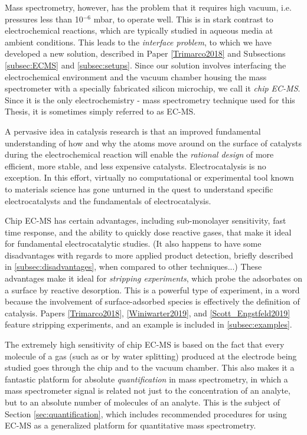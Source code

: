 Mass spectrometry, however, has the problem that it requires high vacuum, i.e. pressures less than 10$^{-6}$ mbar, to operate well. This is in stark contrast to electrochemical reactions, which are typically studied in aqueous media at ambient conditions. This leads to the \textit{interface problem}, to which we have developed a new solution, described in Paper \ref{Trimarco2018} and Subsections \ref{subsec:ECMS} and \ref{subsec:setups}. Since our solution involves interfacing the electrochemical environment and the vacuum chamber housing the mass spectrometer with a specially fabricated silicon microchip, we call it \textit{chip EC-MS}. Since it is the only electrochemistry - mass spectrometry technique used for this Thesis, it is sometimes simply referred to as EC-MS.

A pervasive idea in catalysis research is that an improved fundamental understanding of how and why the atoms move around on the surface of catalysts during the electrochemical reaction will enable the \textit{rational design} of more efficient, more stable, and less expensive catalysts. Electrocatalysis is no exception. In this effort, virtually no computational or experimental tool known to materials science has gone unturned in the quest to understand specific electrocatalysts and the fundamentals of electrocatalysis. 

Chip EC-MS has certain advantages, including sub-monolayer sensitivity, fast time response, and the ability to quickly dose reactive gases, that make it ideal for fundamental electrocatalytic studies. (It also happens to have some disadvantages with regards to more applied product detection, briefly described in \ref{subsec:disadvantages}, when compared to other techniques...) These advantages make it ideal for \textit{stripping experiments}, which probe the adsorbates on a surface by reactive desorption. This is a powerful type of experiment, in a word because the involvement of surface-adsorbed species is effectively the definition of catalysis. Papers \ref{Trimarco2018}, \ref{Winiwarter2019}, and \ref{Scott_Engstfeld2019} feature stripping experiments, and an example is included in \ref{subsec:examples}.

The extremely high sensitivity of chip EC-MS is based on the fact that every molecule of a gas (such as  or  by water splitting) produced at the electrode being studied goes through the chip and to the vacuum chamber. This also makes it a fantastic platform for absolute \textit{quantification} in mass spectrometry, in which a mass spectrometer signal is related not just to the concentration of an analyte, but to an absolute number of molecules of an analyte. This is the subject of Section \ref{sec:quantification}, which includes recommended procedures for using EC-MS as a generalized platform for quantitative mass spectrometry.

